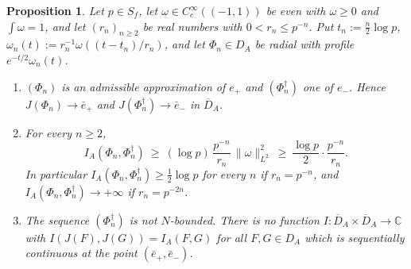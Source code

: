 \documentclass[11pt]{amsart}
\newtheorem{proposition}[theorem]{Proposition}
\theoremstyle{definition}
\theoremstyle{remark}
\newcommand{\C}{\mathbb C}
\newcommand{\DA}{D_A}
\newcommand{\NAd}{\overline{D}_A}
\begin{document}
\begin{proposition}\label{prop:rulingsdiv}
Let $p\in S_f$, let $\omega\in C_c^{\infty}((-1,1))$ be even with $\omega\ge0$
and $\int\omega=1$, and let $(r_n)_{n\ge2}$ be real numbers with
$0<r_n\le p^{-n}$.  Put $t_n:=\tfrac n2\log p$,
$\omega_n(t):=r_n^{-1}\omega((t-t_n)/r_n)$, and let $\Phi_n\in\DA$ be radial
with profile $e^{-t/2}\omega_n(t)$.
\begin{enumerate}
\item[(a)] $(\Phi_n)$ is an admissible approximation of $e_+$ and
$(\Phi_n^{\dagger})$ one of $e_-$.  Hence $J(\Phi_n)\to\bar e_+$ and
$J(\Phi_n^{\dagger})\to\bar e_-$ in $\NAd$.
\item[(b)] For every $n\ge2$,
\begin{equation}\label{eq:rulingsdiv}
I_A(\Phi_n,\Phi_n^{\dagger})\ \ge\ (\log p)\,\frac{p^{-n}}{r_n}\,
\lVert\omega\rVert_{L^{2}}^{2}\ \ge\ \frac{\log p}{2}\cdot\frac{p^{-n}}{r_n}.
\end{equation}
In particular $I_A(\Phi_n,\Phi_n^{\dagger})\ge\tfrac12\log p$ for every $n$
if $r_n=p^{-n}$, and $I_A(\Phi_n,\Phi_n^{\dagger})\to+\infty$ if
$r_n=p^{-2n}$.
\item[(c)] The sequence $(\Phi_n^{\dagger})$ is not $N$-bounded.  There is no
function $I:\NAd\times\NAd\to\C$ with $I(J(F),J(G))=I_A(F,G)$ for all
$F,G\in\DA$ which is sequentially continuous at the point
$(\bar e_+,\bar e_-)$.
\end{enumerate}
\end{proposition}
\end{document}
